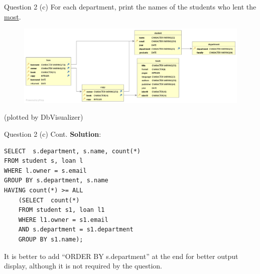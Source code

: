 \begin{frame}[fragile]{Question 2 (c)}
For each department, print the names of the students who lent the \underline{most}.
\begin{figure}
	\includegraphics[width=1\textwidth]{t1/images/t1-end.png}
\end{figure}\vspace{-10pt}
{\tiny(plotted by DbVisualizer)}
\end{frame}


\begin{frame}[fragile]{Question 2 (c) Cont.}
\textbf{Solution}:
	
\begin{lstlisting}
SELECT  s.department, s.name, count(*)
FROM student s, loan l
WHERE l.owner = s.email
GROUP BY s.department, s.name
HAVING count(*) >= ALL
	(SELECT  count(*) 
	FROM student s1, loan l1
	WHERE l1.owner = s1.email
	AND s.department = s1.department
	GROUP BY s1.name);
\end{lstlisting}\vspace{5pt}

\begin{block}{}
It is better to add ``ORDER BY s.department'' at the end for better output display, although it is not required by the question.	
\end{block}
\end{frame}



